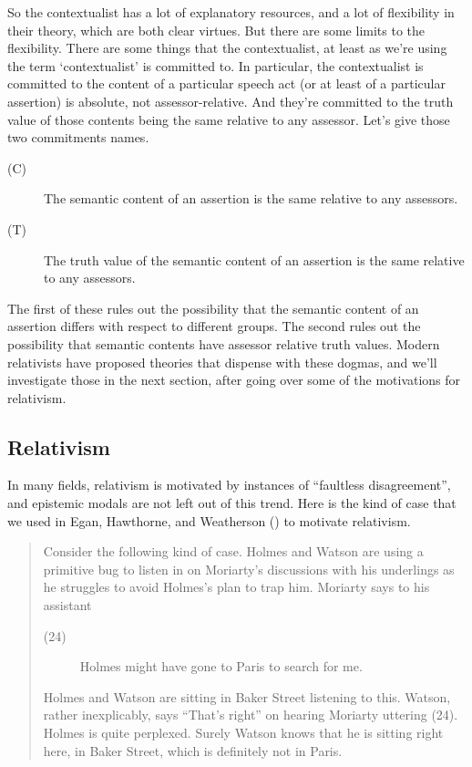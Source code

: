 \documentclass[
  10pt,
  letterpaper,
  DIV=11,
  numbers=noendperiod,
  twoside]{scrartcl}
\begin{document}
So the contextualist has a lot of explanatory resources, and a lot of
flexibility in their theory, which are both clear virtues. But there are
some limits to the flexibility. There are some things that the
contextualist, at least as we're using the term `contextualist' is
committed to. In particular, the contextualist is committed to the
content of a particular speech act (or at least of a particular
assertion) is absolute, not assessor-relative. And they're committed to
the truth value of those contents being the same relative to any
assessor. Let's give those two commitments names.

\begin{description}
\item[(C)]
The semantic content of an assertion is the same relative to any
assessors.
\item[(T)]
The truth value of the semantic content of an assertion is the same
relative to any assessors.
\end{description}

The first of these rules out the possibility that the semantic content
of an assertion differs with respect to different groups. The second
rules out the possibility that semantic contents have assessor relative
truth values. Modern relativists have proposed theories that dispense
with these dogmas, and we'll investigate those in the next section,
after going over some of the motivations for relativism.

\subsection{Relativism}\label{relativism}

In many fields, relativism is motivated by instances of ``faultless
disagreement'', and epistemic modals are not left out of this trend.
Here is the kind of case that we used in Egan, Hawthorne, and Weatherson
() to motivate relativism.

\begin{quote}
Consider the following kind of case. Holmes and Watson are using a
primitive bug to listen in on Moriarty's discussions with his underlings
as he struggles to avoid Holmes's plan to trap him. Moriarty says to his
assistant

\begin{description}
\item[(24)]
Holmes might have gone to Paris to search for me.
\end{description}

Holmes and Watson are sitting in Baker Street listening to this. Watson,
rather inexplicably, says ``That's right'' on hearing Moriarty uttering
(24). Holmes is quite perplexed. Surely Watson knows that he is sitting
right here, in Baker Street, which is definitely not in Paris.
\end{quote}
\end{document}
